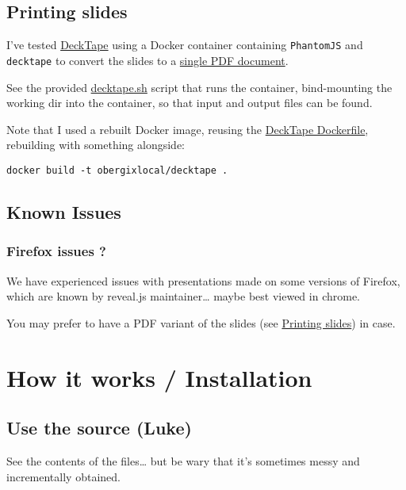 \documentclass[a4paper]{article}
\begin{document}
\subsection{Printing slides}
\label{sec:orgfd9cb7a}

I've tested \href{https://github.com/astefanutti/decktape}{DeckTape} using a Docker container containing \texttt{PhantomJS} and
\texttt{decktape} to convert the slides to a \href{slides.pdf}{single PDF document}.

See the provided \href{bin/decktape.sh}{decktape.sh} script that runs the container, bind-mounting the
working dir into the container, so that input and output files can be
found.

Note that I used a rebuilt Docker image, reusing the \href{https://raw.githubusercontent.com/astefanutti/decktape/master/Dockerfile}{DeckTape
Dockerfile}, rebuilding with something alongside:
\begin{verbatim}
docker build -t obergixlocal/decktape .
\end{verbatim}

\subsection{Known Issues}
\label{sec:org9798358}

\subsubsection{Firefox issues ?}
\label{sec:orgdaa0a93}

We have experienced issues with presentations made on some versions of Firefox, which are known by reveal.js maintainer\ldots{} maybe best viewed in chrome.

You may prefer to have a PDF variant of the slides (see \hyperref[sec:orgfd9cb7a]{Printing slides}) in case.



\section{How it works / Installation}
\label{sec:orgdd868f0}
\subsection{Use the source (Luke)}
\label{sec:orgafe3a18}

See the contents of the files\ldots{} but be wary that it's sometimes messy and incrementally obtained.
\end{document}

